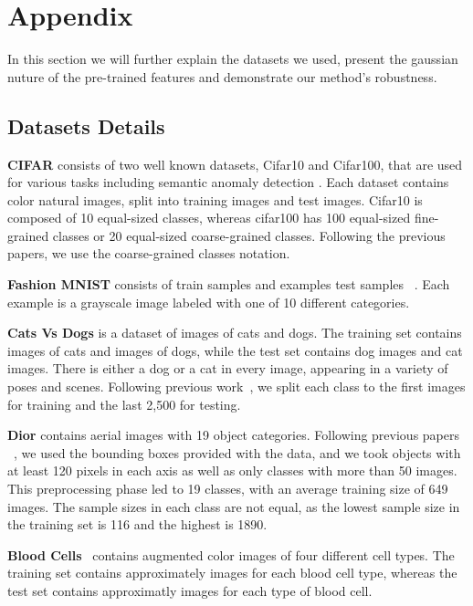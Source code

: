 \documentclass[10pt,twocolumn,letterpaper]{article}
\begin{document}
%
 
{\small


}


\section{Appendix}
In this section we will further explain the datasets we used, present the gaussian nuture of the pre-trained features and demonstrate our method's robustness.

  \subsection{Datasets Details}
  \label{datasets_details}
 
\textbf{CIFAR} consists of two well known datasets, Cifar10 and Cifar100, that are used for various tasks including semantic anomaly detection \cite{krizhevsky2009learning}. Each dataset contains   color natural images, split into  training images and  test images. Cifar10 is composed of 10 equal-sized classes, whereas cifar100 has 100 equal-sized fine-grained classes or 20 equal-sized coarse-grained classes. Following the previous papers, we use the coarse-grained classes notation.

\textbf{Fashion MNIST} consists of  train samples and  examples test samples ~\cite{xiao2017fashion}. Each example is a  grayscale image labeled with one of 10 different categories. 

\textbf{Cats Vs Dogs} is a dataset of images of cats and dogs. The training set contains  images of cats and  images of dogs, while the test set contains  dog images and  cat images. There is either a dog or a cat in every image, appearing in a variety of poses and scenes. Following previous work~\cite{bergman2020deep,reiss2020panda}, we split each class to the first  images for training and the last 2,500 for testing.

\textbf{Dior} contains aerial images with 19 object categories. Following previous papers ~\cite{bergman2020deep,reiss2020panda}, we used the bounding boxes provided with the data, and we took objects with at least 120 pixels in each axis as well as only classes with more than 50 images. This preprocessing phase led to 19 classes, with an average training size of 649 images. The sample sizes in each class are not equal, as the lowest sample size in the training set is 116 and the highest is 1890.


\textbf{Blood Cells}~\cite{shenggan_bccd_2021} contains  augmented color images of four different cell types. The training set contains approximately  images for each blood cell type, whereas the test set contains approximatly  images for each type of blood cell.
\end{document}
